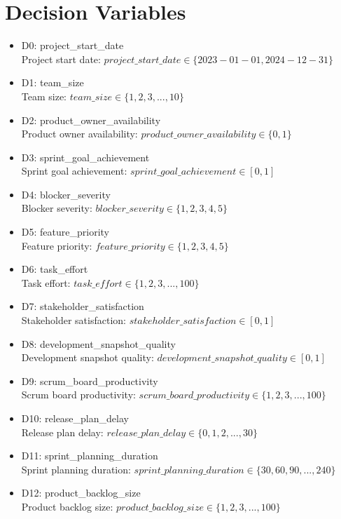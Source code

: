 \documentclass{article}
\begin{document}
\section{Decision Variables}
\begin{itemize}
    \item D0: project\_start\_date \\
    Project start date: $project\_start\_date \in \{2023-01-01, 2024-12-31\}$
    \item D1: team\_size \\
    Team size: $team\_size \in \{1, 2, 3, ..., 10\}$
    \item D2: product\_owner\_availability \\
    Product owner availability: $product\_owner\_availability \in \{0, 1\}$
    \item D3: sprint\_goal\_achievement \\
    Sprint goal achievement: $sprint\_goal\_achievement \in [0, 1]$
    \item D4: blocker\_severity \\
    Blocker severity: $blocker\_severity \in \{1, 2, 3, 4, 5\}$
    \item D5: feature\_priority \\
    Feature priority: $feature\_priority \in \{1, 2, 3, 4, 5\}$
    \item D6: task\_effort \\
    Task effort: $task\_effort \in \{1, 2, 3, ..., 100\}$
    \item D7: stakeholder\_satisfaction \\
    Stakeholder satisfaction: $stakeholder\_satisfaction \in [0, 1]$
    \item D8: development\_snapshot\_quality \\
    Development snapshot quality: $development\_snapshot\_quality \in [0, 1]$
    \item D9: scrum\_board\_productivity \\
    Scrum board productivity: $scrum\_board\_productivity \in \{1, 2, 3, ..., 100\}$
    \item D10: release\_plan\_delay \\
    Release plan delay: $release\_plan\_delay \in \{0, 1, 2, ..., 30\}$
    \item D11: sprint\_planning\_duration \\
    Sprint planning duration: $sprint\_planning\_duration \in \{30, 60, 90, ..., 240\}$
    \item D12: product\_backlog\_size \\
    Product backlog size: $product\_backlog\_size \in \{1, 2, 3, ..., 100\}$
\end{itemize}
\end{document}
